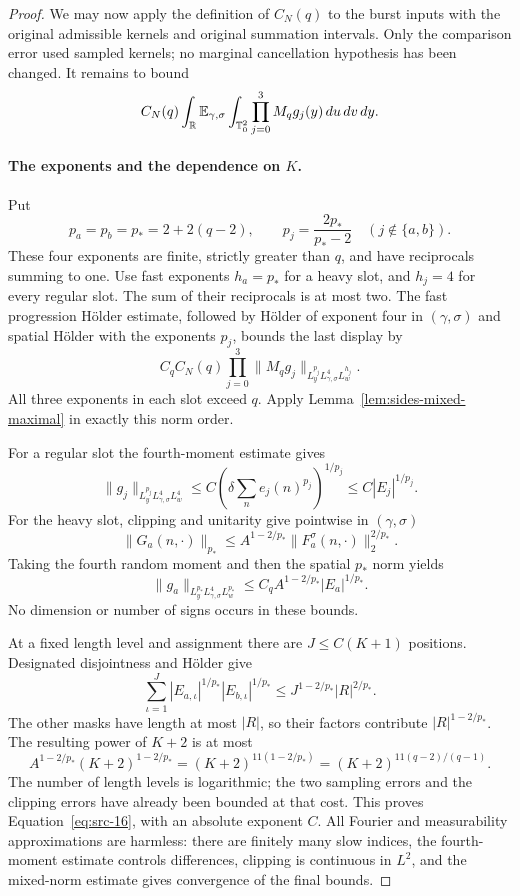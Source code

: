 \begin{proof}
We may now apply the definition of $C_N(q)$ to the burst inputs with
the original admissible kernels and original summation intervals.
Only the comparison error used sampled kernels; no marginal
cancellation hypothesis has been changed.  It remains to bound
\[
 C_N(q)\int_\mathbb R\mathbb E_{\gamma,\sigma}
       \int_{\mathbb T_0^2}\prod_{j=0}^3 M_qg_j(y)\,du\,dv\,dy.
\]

\paragraph{The exponents and the dependence on $K$.}
Put
\[
 p_a=p_b=p_*=2+2(q-2),\qquad
 p_j=\frac{2p_*}{p_*-2}\quad(j\notin\{a,b\}).
\]
These four exponents are finite, strictly greater than $q$, and have
reciprocals summing to one.  Use fast exponents $h_a=p_*$ for a heavy
slot, and $h_j=4$ for every regular slot.  The sum of their reciprocals
is at most two.  The fast progression H\"older estimate, followed by
H\"older of exponent four in $(\gamma,\sigma)$ and spatial H\"older
with the exponents $p_j$, bounds the last display by
\[
 C_q C_N(q)\prod_{j=0}^3
 \|M_qg_j\|_{L_y^{p_j}L_{\gamma,\sigma}^4L_w^{h_j}}.
\]
All three exponents in each slot exceed $q$.  Apply
Lemma~\ref{lem:sides-mixed-maximal} in exactly this norm order.

For a regular slot the fourth-moment estimate gives
\[
 \|g_j\|_{L_y^{p_j}L_{\gamma,\sigma}^4L_w^4}
 \le C\left(\delta\sum_ne_j(n)^{p_j}\right)^{1/p_j}
 \le C|E_j|^{1/p_j}.
\]
For the heavy slot, clipping and unitarity give pointwise in
$(\gamma,\sigma)$
\[
 \|G_a(n,\cdot)\|_{p_*}
 \le A^{1-2/p_*}\|F_a^\sigma(n,\cdot)\|_2^{2/p_*}.
\]
Taking the fourth random moment and then the spatial $p_*$ norm yields
\[
 \|g_a\|_{L_y^{p_*}L_{\gamma,\sigma}^4L_w^{p_*}}
 \le C_q A^{1-2/p_*}|E_a|^{1/p_*}.
\]
No dimension or number of signs occurs in these bounds.

At a fixed length level and assignment there are $J\le C(K+1)$
positions.  Designated disjointness and H\"older give
\[
 \sum_{\iota=1}^J
    |E_{a,\iota}|^{1/p_*}|E_{b,\iota}|^{1/p_*}
 \le J^{1-2/p_*}|R|^{2/p_*}.
\]
The other masks have length at most $|R|$, so their factors contribute
$|R|^{1-2/p_*}$.  The resulting power of $K+2$ is at most
\[
 A^{1-2/p_*}(K+2)^{1-2/p_*}
 =(K+2)^{11(1-2/p_*)}
 =(K+2)^{11(q-2)/(q-1)}.
\]
The number of length levels is logarithmic; the two sampling errors
and the clipping errors have already been bounded at that cost.
This proves Equation~\eqref{eq:src-16}, with an absolute exponent
$C$.  All Fourier and measurability approximations are harmless:
there are finitely many slow indices, the fourth-moment estimate
controls differences, clipping is continuous in $L^2$, and the
mixed-norm estimate gives convergence of the final bounds.
\end{proof}

